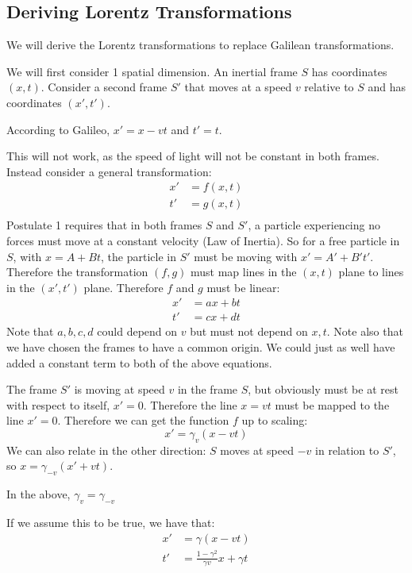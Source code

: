 \documentclass[../Main.tex]{subfiles}
\begin{document}
\subsection{Deriving Lorentz Transformations}
We will derive the Lorentz transformations to replace Galilean transformations.\par
We will first consider 1 spatial dimension. An inertial frame $S$ has coordinates $(x, t)$. Consider a second frame $S'$ that moves at a speed $v$ relative to $S$ and has coordinates $(x', t')$.\par
According to Galileo, $x' = x - vt$ and $t' = t$.\par
This will not work, as the speed of light will not be constant in both frames. Instead consider a general transformation:
\begin{align*}
    x' &= f(x, t) \\
    t' &= g(x, t) \\
\end{align*}
Postulate 1 requires that in both frames $S$ and $S'$, a particle experiencing no forces must move at a constant velocity (Law of Inertia). So for a free particle in $S$, with $x = A + Bt$, the particle in $S'$ must be moving with $x' = A' + B't'$. Therefore the transformation $(f, g)$ must map lines in the $(x, t)$ plane to lines in the $(x', t')$ plane. Therefore $f$ and $g$ must be linear:
\begin{align*}
    x' &= ax + bt \\
    t' &= cx + dt
\end{align*}
Note that $a, b, c, d$ could depend on $v$ but must not depend on $x, t$. Note also that we have chosen the frames to have a common origin. We could just as well have added a constant term to both of the above equations.\par
The frame $S'$ is moving at speed $v$ in the frame $S$, but obviously must be at rest with respect to itself, $x' = 0$. Therefore the line $x = vt$ must be mapped to the line $x' = 0$. Therefore we can get the function $f$ up to scaling:
\begin{equation*}
    x' = \gamma_v (x - vt)
\end{equation*}
We can also relate in the other direction: $S$ moves at speed $-v$ in relation to $S'$, so $x = \gamma_{-v} (x' + vt)$.
\begin{proposition}
    In the above, $\gamma_v = \gamma_{-v}$
\end{proposition}
If we assume this to be true, we have that:
\begin{align}
    x' &= \gamma(x - vt) \label{eqnRelativePosGamma} \\
    t' &= \frac{1-\gamma^2}{\gamma v} x + \gamma t \label{eqnRelativeTimeGamma}
\end{align}
\end{document}
